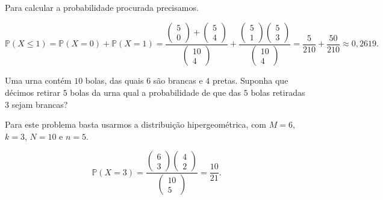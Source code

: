 \documentclass[10pt,a4paper]{article}
\begin{document}
\begin{sol}
	Para calcular a probabilidade procurada precisamos.

\[\mathbb{P}(X\leq 1)=\mathbb{P}(X=0)+\mathbb{P}(X=1)=\frac{\left(\begin{array}{c}5\\0\end{array}\right) + \left(\begin{array}{c}5\\4\end{array}\right)}{\left(\begin{array}{c}10\\4\end{array}\right)} + \frac{\left(\begin{array}{c}5\\1\end{array}\right)\left(\begin{array}{c}5\\3\end{array}\right)}{\left(\begin{array}{c}10\\4\end{array}\right)}=\frac{5}{210}+\frac{50}{210}\approx 0,2619.\]
\end{sol}

\begin{eg}
	Uma urna contém $ 10 $ bolas, das quais $ 6 $ são brancas e $ 4 $ pretas. Suponha que décimos retirar $ 5 $ bolas da urna qual a probabilidade de que das $ 5 $ bolas retiradas $ 3 $ sejam brancas?
\end{eg}

\begin{sol}
	Para este problema basta usarmos a distribuição hipergeométrica, com $ M=6 $, $ k=3 $, $ N=10 $ e $ n=5 $.

\[\mathbb{P}\left(X=3\right)=\frac{\left(\begin{array}{c}6\\3\end{array}\right)\left(\begin{array}{c}4\\2\end{array}\right)}{\left(\begin{array}{c}10\\5\end{array}\right)}=\frac{10}{21}.\]
\end{sol}
\end{document}

